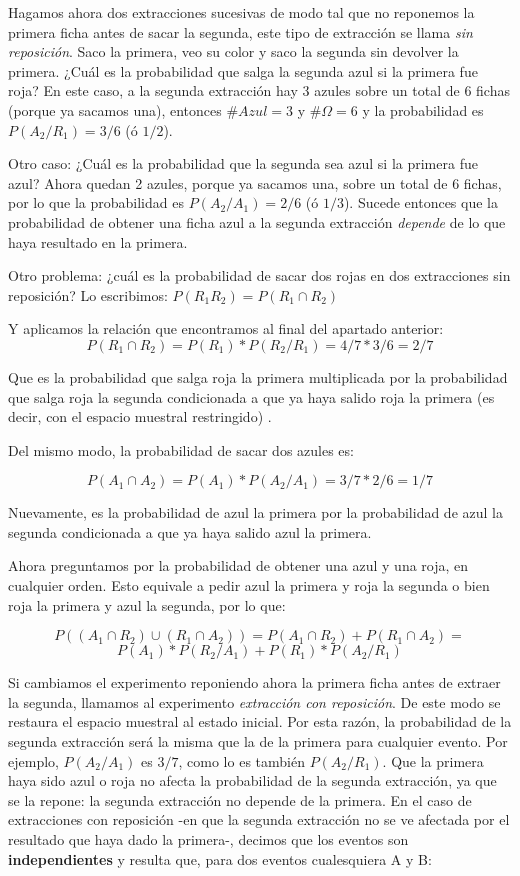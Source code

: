 \documentclass[]{article}
\begin{document}
Hagamos ahora dos extracciones sucesivas de modo tal que no reponemos la
primera ficha antes de sacar la segunda, este tipo de extracción se
llama \emph{sin reposición}. Saco la primera, veo su color y saco la
segunda sin devolver la primera. ¿Cuál es la probabilidad que salga la
segunda azul si la primera fue roja? En este caso, a la segunda
extracción hay 3 azules sobre un total de 6 fichas (porque ya sacamos
una), entonces \(\#Azul = 3\) y \(\#\Omega = 6\) y la probabilidad es
\(P(A_{2}/R_{1}) = 3/6\) (ó \(1/2\)).

Otro caso: ¿Cuál es la probabilidad que la segunda sea azul si la
primera fue azul? Ahora quedan 2 azules, porque ya sacamos una, sobre un
total de 6 fichas, por lo que la probabilidad es
\(P(A_{2}/A_{1}) = 2/6\) (ó \(1/3\)). Sucede entonces que la
probabilidad de obtener una ficha azul a la segunda extracción
\emph{depende} de lo que haya resultado en la primera.

Otro problema: ¿cuál es la probabilidad de sacar dos rojas en dos
extracciones sin reposición? Lo escribimos:
\(P(R_{1}R_{2}) = P(R_{1}\cap R_{2})\)

Y aplicamos la relación que encontramos al final del apartado anterior:
\[P(R_{1}\cap R_{2}) = P(R_{1})*P(R_{2}/R_{1})=4/7*3/6=2/7\]

Que es la probabilidad que salga roja la primera multiplicada por la
probabilidad que salga roja la segunda condicionada a que ya haya salido
roja la primera (es decir, con el espacio muestral restringido) .

Del mismo modo, la probabilidad de sacar dos azules es:

\[P(A_{1}\cap A_{2}) = P(A_{1})*P(A_{2}/A_{1})=3/7*2/6=1/7\]

Nuevamente, es la probabilidad de azul la primera por la probabilidad de
azul la segunda condicionada a que ya haya salido azul la primera.

Ahora preguntamos por la probabilidad de obtener una azul y una roja, en
cualquier orden. Esto equivale a pedir azul la primera y roja la segunda
o bien roja la primera y azul la segunda, por lo que:

\[P((A_{1}\cap R_{2})\cup(R_{1}\cap A_{2}))=P(A_{1} \cap R_{2})+P(R_{1} \cap A_{2}) =\]
\[P(A_{1})*P(R_{2}/A_{1})+P(R_{1})*P(A_{2}/R_{1})\]

Si cambiamos el experimento reponiendo ahora la primera ficha antes de
extraer la segunda, llamamos al experimento \emph{extracción con
reposición}. De este modo se restaura el espacio muestral al estado
inicial. Por esta razón, la probabilidad de la segunda extracción será
la misma que la de la primera para cualquier evento. Por ejemplo,
\(P(A_{2}/A_{1})\) es \(3/7\), como lo es también \(P(A_{2}/R_{1})\).
Que la primera haya sido azul o roja no afecta la probabilidad de la
segunda extracción, ya que se la repone: la segunda extracción no
depende de la primera. En el caso de extracciones con reposición -en que
la segunda extracción no se ve afectada por el resultado que haya dado
la primera-, decimos que los eventos son \textbf{independientes} y
resulta que, para dos eventos cualesquiera A y B:
\end{document}

